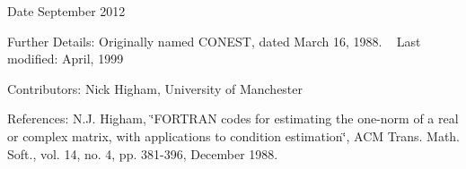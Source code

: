 \begin{DoxyDate}{Date}
September 2012 
\end{DoxyDate}
\begin{DoxyParagraph}{Further Details\+: }
Originally named C\+O\+N\+E\+S\+T, dated March 16, 1988. ~\newline
 Last modified\+: April, 1999 
\end{DoxyParagraph}
\begin{DoxyParagraph}{Contributors\+: }
Nick Higham, University of Manchester 
\end{DoxyParagraph}
\begin{DoxyParagraph}{References\+: }
N.\+J. Higham, \char`\"{}\+F\+O\+R\+T\+R\+A\+N codes for estimating the one-\/norm of
  a real or complex matrix, with applications to condition estimation\char`\"{}, A\+C\+M Trans. Math. Soft., vol. 14, no. 4, pp. 381-\/396, December 1988. 
\end{DoxyParagraph}
